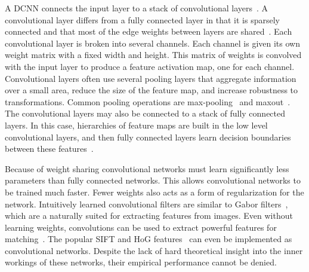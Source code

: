     A DCNN connects the input layer to a stack of convolutional layers~\cite{krizhevsky_imagenet_2012}.
    A convolutional layer differs from a fully connected layer in that it is sparsely connected and that most of the
    edge weights between layers are shared~\cite{lecun_gradientbased_1998, fukushima_neocognitron_1988,
    serre_robust_2007}. Each convolutional layer is broken into several channels. Each channel is given its own weight
    matrix with a fixed width and height. This matrix of weights is convolved with the input layer to produce a feature
    activation map, one for each channel. Convolutional layers often use several pooling layers that aggregate
    information over a small area, reduce the size of the feature map, and increase robustness to transformations.
    Common pooling operations are max-pooling~\cite{serre_robust_2007, krizhevsky_imagenet_2012} and
    maxout~\cite{goodfellow_maxout_2013}.
    The convolutional layers may also be connected to a stack of fully connected layers. In this case, hierarchies of
    feature maps are built in the low level convolutional layers, and then fully connected layers learn decision
    boundaries between these features~\cite{zeiler_visualizing_2014}.

    Because of weight sharing convolutional networks must learn significantly less parameters than fully connected
    networks. This allows convolutional networks to be trained much faster. Fewer weights also acts as a form of
    regularization for the network. Intuitively learned convolutional filters are similar to Gabor
    filters~\cite{gabor_theory_1946}, which are a naturally suited for extracting features from images. Even without
    learning weights, convolutions can be used to extract powerful features for matching~\cite{revaud_deep_2015}. The
    popular SIFT and HoG features~\cite{mahendran_understanding_2014} can even be implemented as convolutional networks.
    Despite the lack of hard theoretical insight into the inner workings of these networks, their empirical performance
    cannot be denied.

